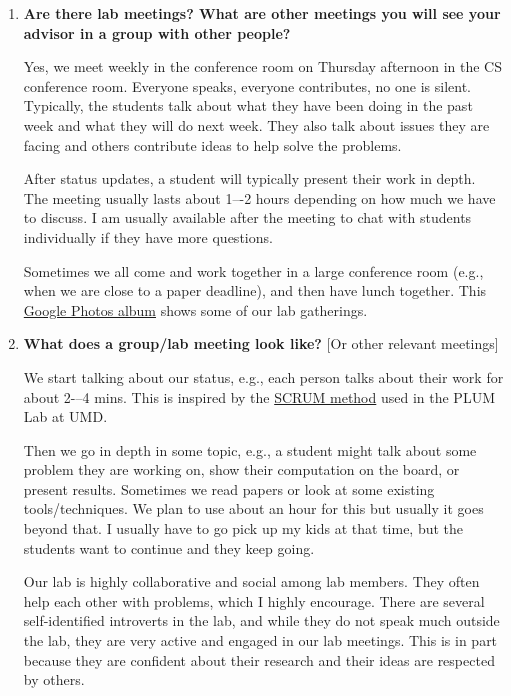 \documentclass{article}
\begin{document}
\begin{enumerate}[label=\arabic*.]
    As the students have more experience, I will let go more and more. By the time the students can write and successfully publish the paper by themselves without much revision and editing from me, then I know they are ready to graduate.

    \item \textbf{Are there lab meetings? What are other meetings you will see your advisor in a group with other people?}  
    
    Yes, we meet weekly in the conference room on Thursday afternoon in the CS conference room. Everyone speaks, everyone contributes, no one is silent. Typically, the students talk about what they have been doing in the past week and what they will do next week. They also talk about issues they are facing and others contribute ideas to help solve the problems.  
   
    After status updates, a student will typically present their work in depth. The meeting usually lasts about 1–-2 hours depending on how much we have to discuss. I am usually available after the meeting to chat with students individually if they have more questions.

    Sometimes we all come and work together in a large conference room (e.g., when we are close to a paper deadline), and then have lunch together. This \href{https://photos.roars.dev/}{Google Photos album} shows some of our lab gatherings.

    \item \textbf{What does a group/lab meeting look like?} [Or other relevant meetings]  
    
    We start talking about our status, e.g., each person talks about their work for about 2-–4 mins. This is inspired by the \href{https://mwhicks1.github.io/papers/score.pdf}{SCRUM method} used in the PLUM Lab at UMD.  
    
    Then we go in depth in some topic, e.g., a student might talk about some problem they are working on, show their computation on the board, or present results. Sometimes we read papers or look at some existing tools/techniques. We plan to use about an hour for this but usually it goes beyond that. I usually have to go pick up my kids at that time, but the students want to continue and they keep going.  

    Our lab is highly collaborative and social among lab members. They often help each other with problems, which I highly encourage.  
    There are several self-identified introverts in the lab, and while they do not speak much outside the lab, they are very active and engaged in our lab meetings. This is in part because they are confident about their research and their ideas are respected by others.



\end{enumerate}
\end{document}

